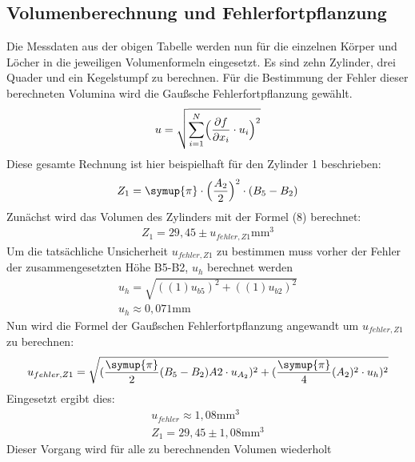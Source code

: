     \subsection{Volumenberechnung und Fehlerfortpflanzung}
    Die Messdaten aus der obigen Tabelle werden nun für die einzelnen Körper und Löcher in die jeweiligen Volumenformeln eingesetzt. Es sind zehn Zylinder, drei Quader und ein Kegelstumpf zu berechnen. Für die Bestimmung der Fehler dieser berechneten Volumina wird die Gaußsche Fehlerfortpflanzung gewählt.
    \begin{gather}
      u = \sqrt{\sum_{i=1}^{N} \Bigl(\frac{\partial f}{\partial x_{i}}\cdot u_i\Bigr)^2}
    \end{gather}
    Diese gesamte Rechnung ist hier beispielhaft für den Zylinder 1 beschrieben:
    \begin{gather}
      Z_{1} = \symup{\pi} \cdot \Bigl(\frac{A_2}{2}\Bigr)^2 \cdot (B_5-B_2)
    \end{gather}
    Zunächst wird das Volumen des Zylinders mit der Formel (8) berechnet:
    \begin{gather}
      Z_{1} = 29,45 \pm u_{fehler,Z1}\unit{\mm^3}
    \end{gather}
    Um die tatsächliche Unsicherheit $u_{fehler,Z1}$ zu bestimmen muss vorher der Fehler der zusammengesetzten Höhe B5-B2, $u_h$ berechnet werden
    \begin{gather}
      u_{h} = \sqrt{((1)u_{b5})^2+((1)u_{b2})^2}\\
            u_{h} \approx  0,071 \unit{\mm}
    \end{gather}
    Nun wird die Formel der Gaußschen Fehlerfortpflanzung angewandt um $u_{fehler,Z1}$ zu berechnen: 
    \begin{gather}
      u_{fehler,Z1} = \sqrt{(\frac{\symup{\pi}}{2}(B_5-B_2)A2 \cdot u_{A_2})^2 + (\frac{\symup{\pi}}{4}(A_2)^2 \cdot u_{h})^2}
    \end{gather}
    Eingesetzt ergibt dies:
    \begin{gather}
      u_{fehler} \approx 1,08\unit{\mm^3}\\
      Z_{1} = 29,45 \pm 1,08\unit{\mm^3}
    \end{gather}
    Dieser Vorgang wird für alle zu berechnenden Volumen wiederholt
